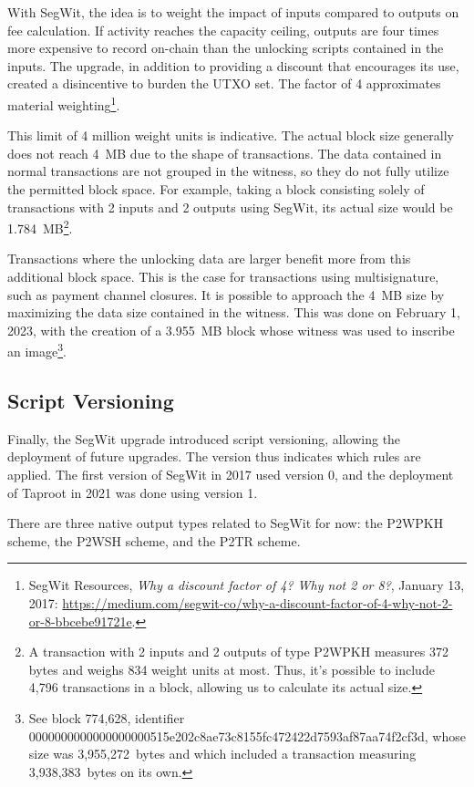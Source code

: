 \documentclass[
  a5paper,
  smalldemyvopaper,10pt,twoside,onecolumn,openright,extrafontsizes,hidelinks]{memoir}
\begin{document}
With SegWit, the idea is to weight the impact of inputs compared to
outputs on fee calculation. If activity reaches the capacity ceiling,
outputs are four times more expensive to record on-chain than the
unlocking scripts contained in the inputs. The upgrade, in addition to
providing a discount that encourages its use, created a disincentive to
burden the UTXO set. The factor of 4 approximates material
weighting\footnote{SegWit Resources, \emph{Why a discount factor of 4?
  Why not 2 or 8?}, January 13, 2017:
  \url{https://medium.com/segwit-co/why-a-discount-factor-of-4-why-not-2-or-8-bbcebe91721e}.}.

This limit of 4 million weight units is indicative. The actual block
size generally does not reach 4~MB due to the shape of transactions. The
data contained in normal transactions are not grouped in the witness, so
they do not fully utilize the permitted block space. For example, taking
a block consisting solely of transactions with 2 inputs and 2 outputs
using SegWit, its actual size would be 1.784~MB\footnote{A transaction
  with 2 inputs and 2 outputs of type P2WPKH measures 372 bytes and
  weighs 834 weight units at most. Thus, it's possible to include 4,796
  transactions in a block, allowing us to calculate its actual size.}.

Transactions where the unlocking data are larger benefit more from this
additional block space. This is the case for transactions using
multisignature, such as payment channel closures. It is possible to
approach the 4~MB size by maximizing the data size contained in the
witness. This was done on February 1, 2023, with the creation of a
3.955~MB block whose witness was used to inscribe an image\footnote{See
  block 774,628, identifier
  0000000000000000000515e202c8ae73c8155fc472422d7593af87aa74f2cf3d,
  whose size was 3,955,272~bytes and which included a transaction
  measuring 3,938,383~bytes on its own.}.

\subsection{Script Versioning}\label{script-versioning}

Finally, the SegWit upgrade introduced script versioning, allowing the
deployment of future upgrades. The version thus indicates which rules
are applied. The first version of SegWit in 2017 used version 0, and the
deployment of Taproot in 2021 was done using version 1.

There are three native output types related to SegWit for now: the
P2WPKH scheme, the P2WSH scheme, and the P2TR scheme.
\end{document}
